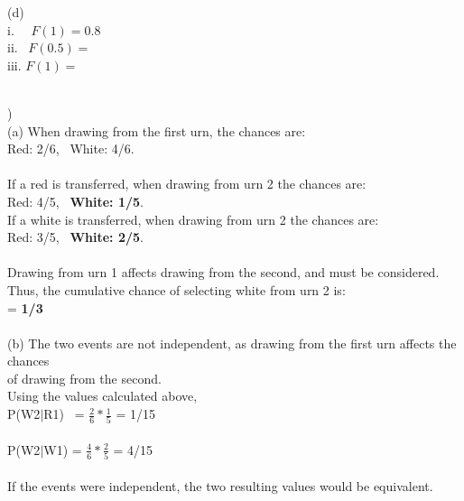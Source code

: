 \documentclass[12pt]{article}
\begin{document}
\indent (d) \\
\indent \indent i. \ \ $F(1) = 0.8$\\[.4em]
\indent \indent ii. \ $F(0.5) = $\\[.4em]
\indent \indent iii. $F(1) = $\\



\noindent \hrulefill \\
\pagebreak


)\\
\indent (a) When drawing from the first urn, the chances are:\\
\indent \indent Red: 2/6, \ White: 4/6.\\\\
\indent \indent If a red is transferred, when drawing from urn 2 the chances are: \\
\indent \indent Red: 4/5, \ \textbf{White: 1/5}.\\
\indent \indent If a white is transferred, when drawing from urn 2 the chances are: \\
\indent \indent Red: 3/5, \ \textbf{White: 2/5}.\\\\
\indent \indent Drawing from urn 1 affects drawing from the second, and must be considered.\\
\indent \indent Thus, the cumulative chance of selecting white from urn 2 is:\\ 
\indent {} = \textbf{1/3}\\\\

\indent (b) The two events are not independent, as drawing from the first urn affects the chances\\
\indent \indent  of drawing from the second.\\
\indent \indent Using the values calculated above, \\
\indent \indent P(W2$|$R1) \ = {\Large$ \frac{2}{6}*\frac{1}{5}$} = 1/15\\\\
\indent \indent P(W2$|$W1) = {\Large$ \frac{4}{6}*\frac{2}{5}$} = 4/15\\\\
\indent \indent If the events were independent, the two resulting values would be equivalent.


\noindent \hrulefill \\
\end{document}
